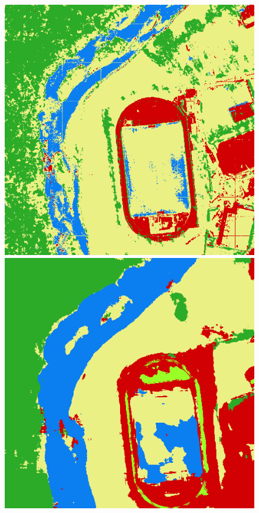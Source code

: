 {\begin{figure}
    \includegraphics[width=\DiscussionImageWidth]{images/segmentation_discussion/densenet/3434.png} \hfill
    \includegraphics[width=\DiscussionImageWidth]{images/segmentation_discussion/unet/3434.png}


\end{figure}}
